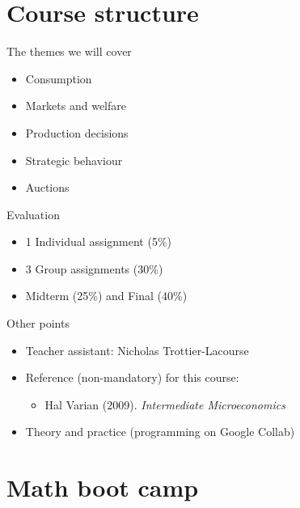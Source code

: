 \documentclass[handout]{beamer}
\begin{document}
\section{Course structure}

\begin{frame}{The themes we will cover}
  \begin{itemize}
  \item<1-> Consumption
  \item<2-> Markets and welfare
  \item<3-> Production decisions
  \item<4-> Strategic behaviour
  \item<5-> Auctions
  \end{itemize}
  
\end{frame}

\begin{frame}{Evaluation}

\begin{itemize}
\item 1 Individual assignment (5\%)
\item 3 Group assignments (30\%)
\item Midterm (25\%) and Final (40\%)
\end{itemize}

\end{frame}

\begin{frame}{Other points}

\begin{itemize}
\item Teacher assistant: Nicholas Trottier-Lacourse
\item Reference (non-mandatory) for this course:
\begin{itemize}
    \item Hal Varian (2009). \textit{Intermediate Microeconomics}
\end{itemize}
\item Theory and practice (programming on Google Collab)
\end{itemize}

\end{frame}

\section{Math boot camp}
\end{document}
